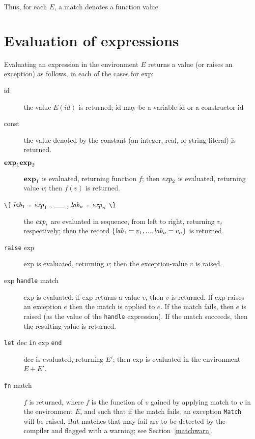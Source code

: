 Thus, for each $E$, a match denotes a function value.

\section{Evaluation of expressions}
Evaluating an expression in the environment $E$ returns a value (or raises an
exception) as follows, in each of the cases for exp:
\begin{description}
\item[id\hfill]  the value $E(id)$ is returned; id may be a variable-id or a
constructor-id
\item[const\hfill]  the value denoted by the constant (an integer, real, or
string literal) is returned.
\item[${\bf exp}_1 {\bf exp}_2$\hfill] ${\bf exp}_1$ is evaluated, 
returning function $f$; then ${\it exp}_2$
is evaluated, returning value $v$; then $f(v)$ is returned.
\item[\protect\verb"\{" ${\it lab}_1$ \protect\verb"=" ${\it exp}_1$ , \underline{\ \ \ } , ${\it lab}_n$ \protect\verb"=" ${\it exp}_n$ \protect\verb"\}" \hfill]  
the ${\it exp}_i$ are evaluated in sequence, from left to right,
returning $v_i$ respectively; then the record 
$\{ {\it lab}_1 = v_1 , ... , {\it lab}_n = v_n \}$ is returned.
\item[\protect\verb"raise" exp\hfill]  exp is evaluated, returning $v$; then 
the exception-value $v$ is raised.

\item[exp \verb"handle" match\hfill]  exp is evaluated; if exp returns a
value $v$, then $v$ is returned.  If exp raises an exception $e$ then
the match is applied to $e$.  If the match fails, then $e$ is raised
(as the value of the \verb"handle" expression).  If the match
succeeds, then the resulting value is returned.

\item[\verb"let" dec \verb"in" exp \verb"end"\hfill]  dec is evaluated,
returning $E'$; then exp is evaluated in the environment $E+E'$.

\item[\verb"fn" match\hfill]  $f$ is returned, where $f$ is the function of
$v$ gained by applying match to $v$ in the environment $E$, and such
that if the match fails, an exception \verb"Match" will be raised.
\label{raisematch}
But matches that may fail are to be detected by the
compiler and flagged with a warning; see Section~\ref{matchwarn}.
\end{description}

